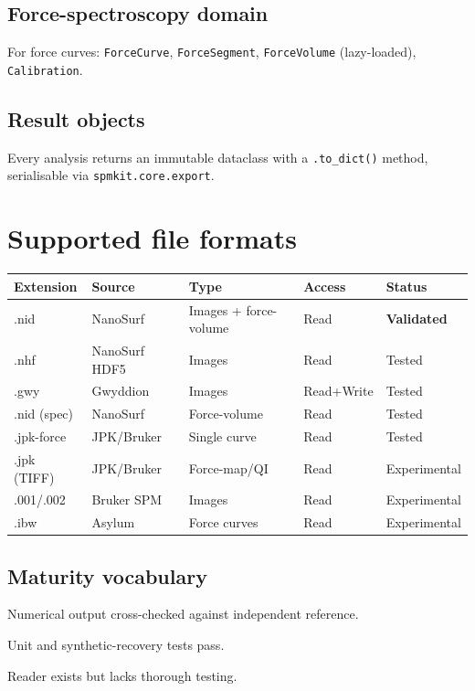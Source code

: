 \documentclass[a4paper,11pt]{article}
\begin{document}
\subsection{Force-spectroscopy domain}

For force curves: \texttt{ForceCurve}, \texttt{ForceSegment}, \texttt{ForceVolume}
(lazy-loaded), \texttt{Calibration}.

\subsection{Result objects}
Every analysis returns an immutable dataclass with a \texttt{.to\_dict()} method,
serialisable via \texttt{spmkit.core.export}.

\section{Supported file formats}

\begin{longtable}{@{}l l l l l@{}}
\toprule
Extension & Source & Type & Access & Status \\
\midrule
.nid & NanoSurf & Images + force-volume & Read & \textbf{Validated} \\
.nhf & NanoSurf HDF5 & Images & Read & Tested \\
.gwy & Gwyddion & Images & Read+Write & Tested \\
.nid (spec) & NanoSurf & Force-volume & Read & Tested \\
.jpk-force & JPK/Bruker & Single curve & Read & Tested \\
.jpk (TIFF) & JPK/Bruker & Force-map/QI & Read & Experimental \\
.001/.002 & Bruker SPM & Images & Read & Experimental \\
.ibw & Asylum & Force curves & Read & Experimental \\
\bottomrule
\end{longtable}

\subsection{Maturity vocabulary}
\begin{description}[nosep]
  \item[Validated] Numerical output cross-checked against independent reference.
  \item[Tested] Unit and synthetic-recovery tests pass.
  \item[Experimental] Reader exists but lacks thorough testing.
\end{description}
\end{document}
